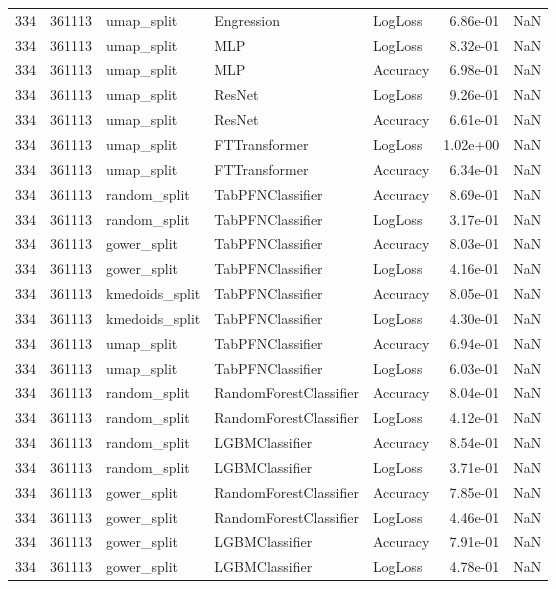 \begin{tabular}{rrlllrr}
334 & 361113 & umap\_split & Engression & LogLoss & 6.86e-01 & NaN \\
334 & 361113 & umap\_split & MLP & LogLoss & 8.32e-01 & NaN \\
334 & 361113 & umap\_split & MLP & Accuracy & 6.98e-01 & NaN \\
334 & 361113 & umap\_split & ResNet & LogLoss & 9.26e-01 & NaN \\
334 & 361113 & umap\_split & ResNet & Accuracy & 6.61e-01 & NaN \\
334 & 361113 & umap\_split & FTTransformer & LogLoss & 1.02e+00 & NaN \\
334 & 361113 & umap\_split & FTTransformer & Accuracy & 6.34e-01 & NaN \\
334 & 361113 & random\_split & TabPFNClassifier & Accuracy & 8.69e-01 & NaN \\
334 & 361113 & random\_split & TabPFNClassifier & LogLoss & 3.17e-01 & NaN \\
334 & 361113 & gower\_split & TabPFNClassifier & Accuracy & 8.03e-01 & NaN \\
334 & 361113 & gower\_split & TabPFNClassifier & LogLoss & 4.16e-01 & NaN \\
334 & 361113 & kmedoids\_split & TabPFNClassifier & Accuracy & 8.05e-01 & NaN \\
334 & 361113 & kmedoids\_split & TabPFNClassifier & LogLoss & 4.30e-01 & NaN \\
334 & 361113 & umap\_split & TabPFNClassifier & Accuracy & 6.94e-01 & NaN \\
334 & 361113 & umap\_split & TabPFNClassifier & LogLoss & 6.03e-01 & NaN \\
334 & 361113 & random\_split & RandomForestClassifier & Accuracy & 8.04e-01 & NaN \\
334 & 361113 & random\_split & RandomForestClassifier & LogLoss & 4.12e-01 & NaN \\
334 & 361113 & random\_split & LGBMClassifier & Accuracy & 8.54e-01 & NaN \\
334 & 361113 & random\_split & LGBMClassifier & LogLoss & 3.71e-01 & NaN \\
334 & 361113 & gower\_split & RandomForestClassifier & Accuracy & 7.85e-01 & NaN \\
334 & 361113 & gower\_split & RandomForestClassifier & LogLoss & 4.46e-01 & NaN \\
334 & 361113 & gower\_split & LGBMClassifier & Accuracy & 7.91e-01 & NaN \\
334 & 361113 & gower\_split & LGBMClassifier & LogLoss & 4.78e-01 & NaN \\

\end{tabular}
